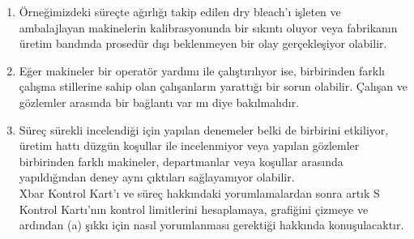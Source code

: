 \begin{enumerate}[label=\Roman{enumi}.]
	\item 
	Örneğimizdeki süreçte ağırlığı takip edilen dry bleach’ı işleten ve ambalajlayan makinelerin kalibrasyonunda bir sıkıntı oluyor veya fabrikanın üretim bandında prosedür dışı beklenmeyen bir olay gerçekleşiyor olabilir. 
	\item 
	Eğer makineler bir operatör yardımı ile çalıştırılıyor ise, birbirinden farklı çalışma stillerine sahip olan çalışanların yarattığı bir sorun olabilir. Çalışan ve gözlemler arasında bir bağlantı var mı diye bakılmalıdır. 
	\item 
	Süreç sürekli incelendiği için yapılan denemeler belki de birbirini etkiliyor, üretim hattı düzgün koşullar ile incelenmiyor veya yapılan gözlemler birbirinden farklı makineler, departmanlar veya koşullar arasında yapıldığından deney aynı çıktıları sağlayamıyor olabilir. \\
	
	Xbar Kontrol Kart'ı ve süreç hakkındaki yorumlamalardan sonra artık S Kontrol Kartı’nın kontrol limitlerini hesaplamaya, grafiğini çizmeye ve ardından (a) şıkkı için nasıl yorumlanması gerektiği hakkında konuşulacaktır. 
	
\end{enumerate}
